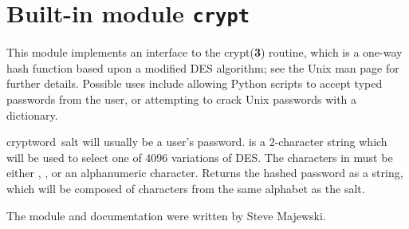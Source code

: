 \section{Built-in module {\tt crypt}}

This module implements an interface to the crypt({\bf 3}) routine,
which is a one-way hash function based upon a modified DES algorithm;
see the Unix man page for further details.  Possible uses include
allowing Python scripts to accept typed passwords from the user, or
attempting to crack Unix passwords with a dictionary.

\renewcommand{\indexsubitem}{(in module crypt)}
\begin{funcdesc}{crypt}{word\, salt} 
 will usually be a user's password.   is a
2-character string which will be used to select one of 4096 variations
of DES.  The characters in  must be either ,
\code{/}, or an alphanumeric character.  Returns the hashed password
as a string, which will be composed of characters from the same
alphabet as the salt.
\end{funcdesc}

The module and documentation were written by Steve Majewski.
